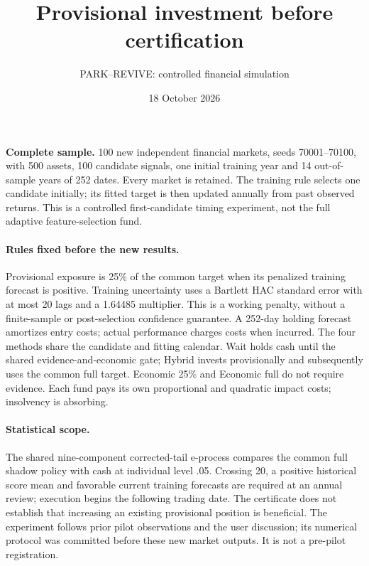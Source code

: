 \documentclass[10pt,a4paper]{article}
\title{Provisional investment before certification}
\author{PARK--REVIVE: controlled financial simulation}
\date{18 October 2026}
\begin{document}
\maketitle
\noindent\textbf{Complete sample.} 100 new independent financial markets, seeds
70001--70100, with 500 assets, 100 candidate signals, one initial training year
and 14 out-of-sample years of 252 dates. Every market is retained.
The training rule selects one candidate initially; its fitted target is then
updated annually from past observed returns. This is a controlled first-candidate
timing experiment, not the full adaptive feature-selection fund.

\paragraph{Rules fixed before the new results.}
Provisional exposure is 25\% of the common target when its penalized training
forecast is positive. Training uncertainty uses a Bartlett HAC standard error
with at most 20 lags and a 1.64485 multiplier. This is a working penalty,
without a finite-sample or post-selection confidence guarantee. A 252-day
holding forecast amortizes entry costs; actual performance charges costs when
incurred. The four methods share the candidate and fitting calendar.
Wait holds cash until the shared evidence-and-economic gate; Hybrid invests
provisionally and subsequently uses the common full target. Economic 25\%
and Economic full do not require evidence. Each fund pays its own proportional
and quadratic impact costs; insolvency is absorbing.

\paragraph{Statistical scope.}
The shared nine-component corrected-tail e-process compares the common full
shadow policy with cash at individual level .05. Crossing 20, a positive
historical score mean and favorable current training forecasts are required
at an annual review; execution begins the following trading date.
The certificate does not establish that increasing an existing provisional
position is beneficial. The experiment follows prior pilot observations and
the user discussion; its numerical protocol was committed before these new
market outputs. It is not a pre-pilot registration.
\end{document}

